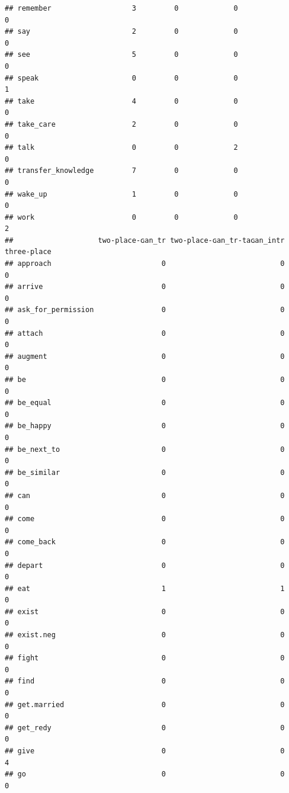 \documentclass[
]{article}
\begin{document}
\begin{verbatim}
## remember                   3         0             0                  0
## say                        2         0             0                  0
## see                        5         0             0                  0
## speak                      0         0             0                  1
## take                       4         0             0                  0
## take_care                  2         0             0                  0
## talk                       0         0             2                  0
## transfer_knowledge         7         0             0                  0
## wake_up                    1         0             0                  0
## work                       0         0             0                  2
##                    two-place-ɢan_tr two-place-ɢan_tr-taɢan_intr three-place
## approach                          0                           0           0
## arrive                            0                           0           0
## ask_for_permission                0                           0           0
## attach                            0                           0           0
## augment                           0                           0           0
## be                                0                           0           0
## be_equal                          0                           0           0
## be_happy                          0                           0           0
## be_next_to                        0                           0           0
## be_similar                        0                           0           0
## can                               0                           0           0
## come                              0                           0           0
## come_back                         0                           0           0
## depart                            0                           0           0
## eat                               1                           1           0
## exist                             0                           0           0
## exist.neg                         0                           0           0
## fight                             0                           0           0
## find                              0                           0           0
## get.married                       0                           0           0
## get_redy                          0                           0           0
## give                              0                           0           4
## go                                0                           0           0

\end{verbatim}
\end{document}
